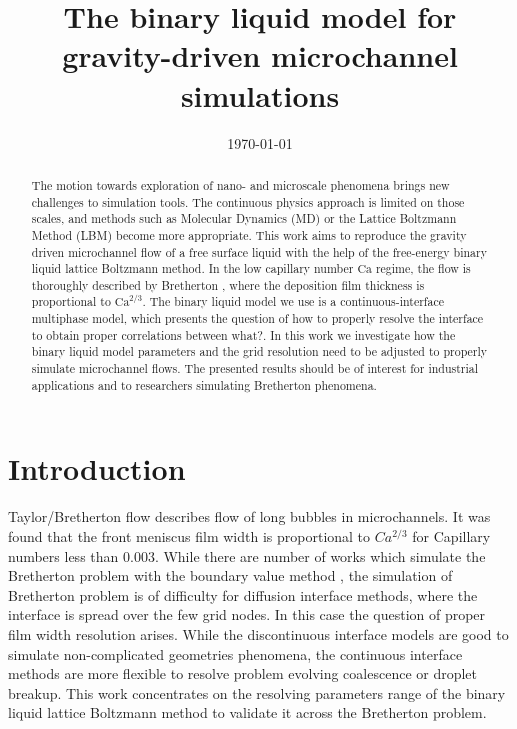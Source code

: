 \documentclass{article}
\title{The binary liquid model for gravity-driven microchannel simulations}
\date{\today}
\newcommand{\Ca}{\mathrm{Ca}}
\newcommand{\todo}[1]{{\color{red}#1}}
\begin{document}
\maketitle

\begin{abstract}
The motion towards exploration of nano- and microscale phenomena brings new
challenges to simulation tools. The continuous physics approach is limited on
those scales, and methods such as Molecular Dynamics (MD) or the Lattice
Boltzmann Method (LBM) become more appropriate. This work aims to
reproduce the gravity driven microchannel flow of a free surface liquid with the
help of the free-energy binary liquid lattice Boltzmann method. In the low capillary number
$\Ca$ regime, the flow is thoroughly described by Bretherton \cite{bretherton},
where the deposition film thickness is proportional to $\Ca^{2/3}$. The binary
liquid model we use is a continuous-interface multiphase model, which presents
the question of how to properly resolve the interface to obtain proper correlations \todo{between what?}.
In this work we investigate how the binary liquid model parameters and the grid resolution
need to be adjusted to properly simulate microchannel flows.  The presented results
should be of interest for industrial applications and to researchers simulating
Bretherton phenomena.
\end{abstract}


\section{Introduction}
Taylor/Bretherton \cite{bretherton} flow describes flow of long bubbles in
microchannels. It was found that the front meniscus film width is proportional
to $Ca^{2/3}$ for Capillary numbers less than $0.003$. While there are number
of works which simulate the Bretherton problem with the boundary value method
\cite{ingham-plates,heil-bretherton}, the simulation of Bretherton problem is of
difficulty for diffusion interface methods, where the interface is spread over
the few grid nodes. In this case the question of proper film width resolution
arises. While the discontinuous interface models are good to simulate
non-complicated geometries phenomena, the continuous interface methods are more
flexible to resolve problem evolving coalescence or droplet breakup. This work
concentrates on the resolving parameters range of the binary liquid lattice
Boltzmann method to validate it across the Bretherton problem. 
\end{document}
